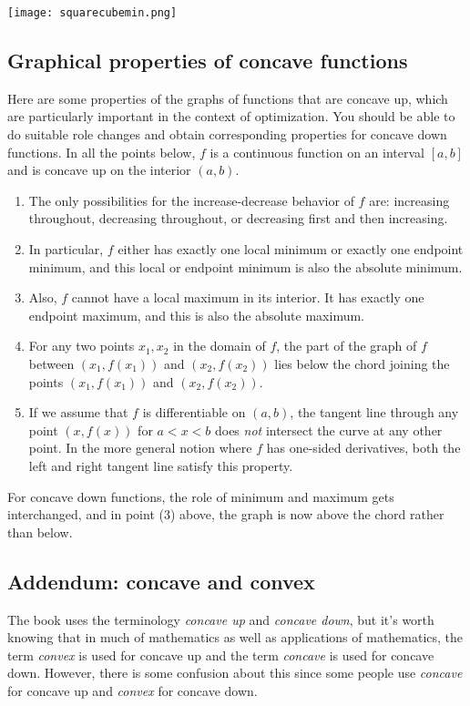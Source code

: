 \documentclass[10pt]{amsart}
\begin{document}
\texttt{[image: squarecubemin.png]}

\subsection{Graphical properties of concave functions}

Here are some properties of the graphs of functions that are concave
up, which are particularly important in the context of
optimization. You should be able to do suitable role changes and
obtain corresponding properties for concave down functions. In all the
points below, $f$ is a continuous function on an interval $[a,b]$ and
is concave up on the interior $(a,b)$.

\begin{enumerate}
\item The only possibilities for the increase-decrease behavior of $f$
  are: increasing throughout, decreasing throughout, or decreasing
  first and then increasing.
\item In particular, $f$ either has exactly one local minimum or
  exactly one endpoint minimum, and this local or endpoint minimum is
  also the absolute minimum.
\item Also, $f$ cannot have a local maximum in its interior. It has
  exactly one endpoint maximum, and this is also the absolute maximum.
\item For any two points $x_1, x_2$ in the domain of $f$, the part of
  the graph of $f$ between $(x_1,f(x_1))$ and $(x_2,f(x_2))$ lies
  below the chord joining the points $(x_1,f(x_1))$ and
  $(x_2,f(x_2))$.
\item If we assume that $f$ is differentiable on $(a,b)$, the tangent
  line through any point $(x,f(x))$ for $a < x < b$ does {\em not}
  intersect the curve at any other point. In the more general notion
  where $f$ has one-sided derivatives, both the left and right tangent
  line satisfy this property.
\end{enumerate}

For concave down functions, the role of minimum and maximum gets
interchanged, and in point (3) above, the graph is now above the chord
rather than below.

\subsection{Addendum: concave and convex}

The book uses the terminology {\em concave up} and {\em concave down},
but it's worth knowing that in much of mathematics as well as
applications of mathematics, the term {\em convex} is used for concave
up and the term {\em concave} is used for concave down. However, there
is some confusion about this since some people use {\em concave} for
concave up and {\em convex} for concave down.
\end{document}

